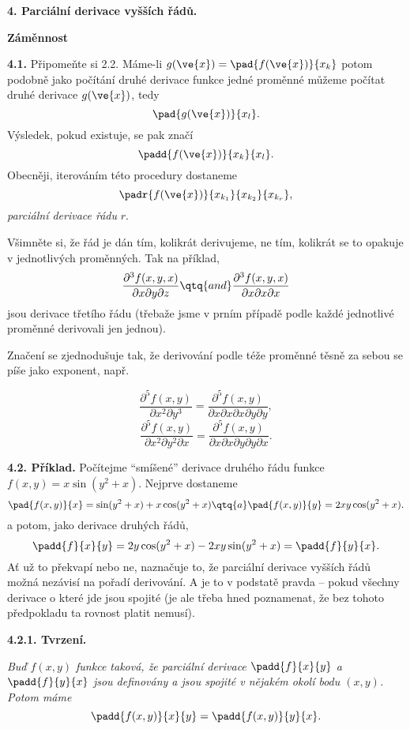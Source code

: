 \documentclass[12pt]{article}
\begin{document}
{\vskip10mm

 
  
 {\large\bf 4. Parciální derivace vyšších řádů.}
 
 \medskip
 
 \hskip7mm {\large\bf Záměnnost}
 
 \bigskip
 



{\bf 4.1.} Připomeňte si 2.2. Máme-li $g(\ve{x})=\pad{f(\ve{x})}{x_k}$ potom podobně jako počítání druhé derivace
funkce jedné proměnné můžeme počítat druhé derivace $g(\ve{x})$, tedy
$$
\pad{g(\ve{x})}{x_l}.
$$
Výsledek, pokud existuje, se pak značí
$$
\padd{f(\ve{x})}{x_k}{x_l}.
$$
Obecněji, iterováním této procedury dostaneme
$$
\padr{f(\ve{x})}{x_{k_1}}{x_{k_2}}{x_{k_r}},
$$
{\em parciální derivace řádu} $r$.

Všimněte si, že řád je dán tím, kolikrát derivujeme, ne tím, kolikrát se to opakuje v jednotlivých proměnných.
Tak na příklad,
$$
\frac{\partial^3f(x,y,x)}{\partial x\partial y\partial z}\qtq{and}
\frac{\partial^3f(x,y,x)}{\partial x\partial x\partial x}
$$
jsou derivace třetího řádu (třebaže jsme v prním případě podle každé jednotlivé proměnné derivovali jen jednou).

Značení se zjednodušuje tak, že derivování podle téže proměnné těsně za sebou
se píše jako exponent, např.

$$
\frac{\partial^5f(x,y)}{\partial x^2\partial y^3}=\frac{\partial^5f(x,y)}{
\partial x\partial x\partial x\partial y\partial y},
$$
$$\frac{\partial^5f(x,y)}{\partial x^2\partial y^2\partial x}
=\frac{\partial^5f(x,y)}{\partial x\partial x \partial y \partial y\partial x}.$$ 

\bigskip

{\bf 4.2. Příklad.} Počítejme ``smíšené'' derivace druhého řádu funkce 
$
f(x,y)= x\sin(y^2+x).
$
Nejprve dostaneme 
$$
\pad{f(x,y)}{x}=\sin(y^2+x)+x\cos(y^2+x)\qtq{a} \pad{f(x,y)}{y}=2xy\cos(y^2+x).
$$
a potom, jako derivace druhých řádů,
$$
\padd{f}{x}{y}=2y\cos(y^2+x)-2xy\sin(y^2+x)=\padd{f}{y}{x}.
$$
Ať už to překvapí nebo ne, naznačuje to, že parciální derivace vyšších řádů možná nezávisí na pořadí derivování.  A je to v podstatě pravda -- pokud všechny derivace o které jde jsou spojité
(je ale třeba hned poznamenat, že bez tohoto předpokladu
ta rovnost platit nemusí).

\medskip

{\bf 4.2.1. Tvrzení.} {\em Buď $f(x,y)$ funkce taková, že
parciální derivace $\padd{f}{x}{y}$ a $\padd{f}{y}{x}$ jsou definovány a jsou spojité
v nějakém okolí bodu $(x,y)$. Potom máme
$$
\padd{f(x,y)}{x}{y}=\padd{f(x,y)}{y}{x}.
$$

}}
\end{document}
